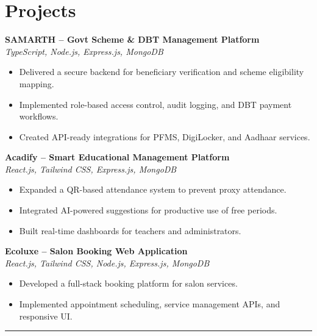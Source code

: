 \documentclass[a4paper,10pt]{article}
\begin{document}
\begin{minipage}[t]{0.63\textwidth}
\section*{Projects}

\textbf{SAMARTH -- Govt Scheme \& DBT Management Platform} \\
\textit{TypeScript, Node.js, Express.js, MongoDB}
\begin{itemize}
  \item Delivered a secure backend for beneficiary verification and scheme eligibility mapping.
  \item Implemented role-based access control, audit logging, and DBT payment workflows.
  \item Created API-ready integrations for PFMS, DigiLocker, and Aadhaar services.
\end{itemize}
\vspace{2mm}

\textbf{Acadify -- Smart Educational Management Platform} \\
\textit{React.js, Tailwind CSS, Express.js, MongoDB}
\begin{itemize}
  \item Expanded a QR-based attendance system to prevent proxy attendance.
  \item Integrated AI-powered suggestions for productive use of free periods.
  \item Built real-time dashboards for teachers and administrators.
\end{itemize}
\vspace{2mm}

\textbf{Ecoluxe -- Salon Booking Web Application} \\
\textit{React.js, Tailwind CSS, Node.js, Express.js, MongoDB}
\begin{itemize}
  \item Developed a full-stack booking platform for salon services.
  \item Implemented appointment scheduling, service management APIs, and responsive UI.
\end{itemize}
\vspace{1mm}
\noindent\color{myblue}\rule{\linewidth}{1pt}
\vspace{2mm}

\end{minipage}
\end{document}
